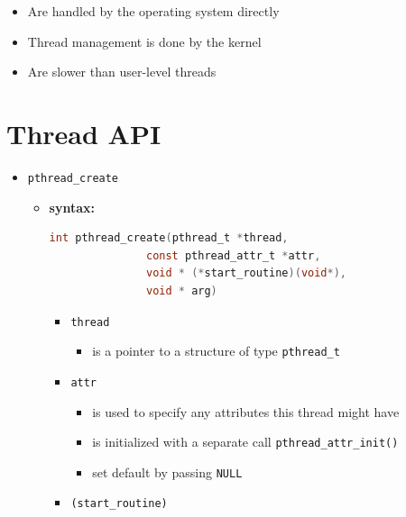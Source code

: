 \documentclass[12pt]{article}
\begin{document}
\begin{itemize}
\begin{itemize}
        \begin{itemize}
            \item Are handled by the operating system directly
            \item Thread management is done by the kernel
            \item Are slower than user-level threads
        \end{itemize}
    \end{itemize}
\end{itemize}

\section{Thread API}

\begin{itemize}

    \item \texttt{pthread\_create}

    \begin{itemize}
        \item \textbf{syntax:}

        \bigskip
\begin{lstlisting}[language=c]
int pthread_create(pthread_t *thread,
               const pthread_attr_t *attr,
               void * (*start_routine)(void*),
               void * arg)
\end{lstlisting}

        \begin{itemize}
            \item \texttt{thread}

            \begin{itemize}
                \item is a pointer to a structure of type \texttt{pthread\_t}
            \end{itemize}
            \item \texttt{attr}

            \begin{itemize}
                \item is used to specify any attributes this thread might have
                \item is initialized with a separate call \texttt{pthread\_attr\_init()}
                \item set default by passing \texttt{NULL}
            \end{itemize}

            \item \texttt{(start\_routine)}


\end{itemize}
\end{itemize}
\end{itemize}
\end{document}
